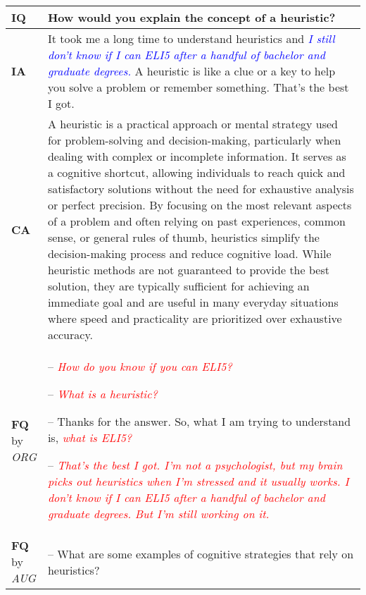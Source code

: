 \begin{table*}[ht]
    \centering
    \footnotesize
    \renewcommand{\arraystretch}{1.2}  %
    \begin{tabular}{m{} m{}}
        \toprule
        \textbf{IQ} & How would you explain the concept of a heuristic?\\
        \midrule
        \textbf{IA} & It took me a long time to understand heuristics and \textcolor{blue}{\textit{I still don't know if I can ELI5 after a handful of bachelor and graduate degrees.}}  A heuristic is like a clue or a key to help you solve a problem or remember something. That's the best I got. \\
        \midrule
        \textbf{CA} & A heuristic is a practical approach or mental strategy used for problem-solving and decision-making, particularly when dealing with complex or incomplete information. It serves as a cognitive shortcut, allowing individuals to reach quick and satisfactory solutions without the need for exhaustive analysis or perfect precision. By focusing on the most relevant aspects of a problem and often relying on past experiences, common sense, or general rules of thumb, heuristics simplify the decision-making process and reduce cognitive load. While heuristic methods are not guaranteed to provide the best solution, they are typically sufficient for achieving an immediate goal and are useful in many everyday situations where speed and practicality are prioritized over exhaustive accuracy. \\
        \midrule
        \shortstack{\textbf{FQ}\\by\\\textit{ORG}}  & 
            -- \textcolor{red}{\textit{How do you know if you can ELI5?}}

            -- \textcolor{red}{\textit{What is a heuristic?}}
            
            -- Thanks for the answer.  So, what I am trying to understand is, \textcolor{red}{\textit{what is ELI5?}}
            
            -- \textcolor{red}{\textit{That's the best I got. I'm not a psychologist, but my brain picks out heuristics when I'm stressed and it usually works. I don't know if I can ELI5 after a handful of bachelor and graduate degrees. But I'm still working on it.}}
 \\
        \midrule
        \shortstack{\textbf{FQ}\\by\\\textit{AUG}} &
        -- What are some examples of cognitive strategies that rely on heuristics?
        

\end{tabular}
\end{table*}
